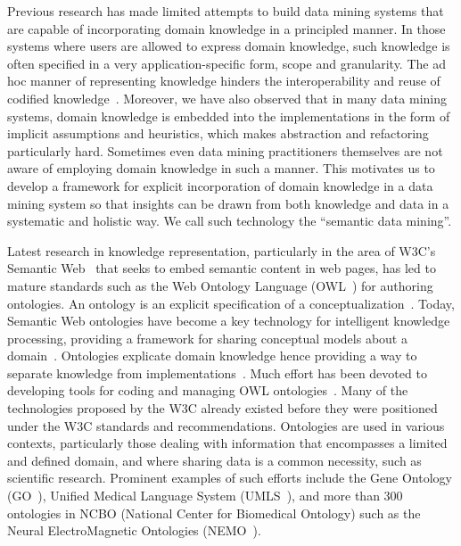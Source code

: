 Previous research has made limited attempts to build data mining systems that are capable of incorporating domain knowledge in a principled manner. In those systems where users are allowed to express domain knowledge, such knowledge is often specified in a very application-specific form, scope and granularity. The ad hoc manner of representing knowledge hinders the interoperability and reuse of codified knowledge~\cite{Pohle03}. Moreover, we have also observed that in many data mining systems, domain knowledge is embedded into the implementations in the form of implicit assumptions and heuristics, which makes abstraction and refactoring particularly hard. Sometimes even data mining practitioners themselves are not aware of employing domain knowledge in such a manner. This motivates us to develop a framework for explicit incorporation of domain knowledge in a data mining system so that insights can be drawn from both knowledge and data in a systematic and holistic way. We call such technology the ``semantic data mining''. 

Latest research in knowledge representation, particularly in the area of W3C's Semantic Web~\cite{Berners-Lee01} that seeks to embed semantic content in web pages, has led to mature standards such as the Web Ontology Language (OWL~\cite{OWL}) for authoring ontologies. An ontology is an explicit specification of a conceptualization~\cite{Gruber93}. Today, Semantic Web ontologies have become a key technology for intelligent knowledge processing, providing a framework for sharing conceptual models about a domain~\cite{Maedche03Onto}. Ontologies explicate domain knowledge hence providing a way to separate knowledge from implementations~\cite{Noy01ontologydevelopment}. Much effort has been devoted to developing tools for coding and managing OWL ontologies~\cite{Duineveld00, Knublauch04}. Many of the technologies proposed by the W3C already existed before they were positioned under the W3C standards and recommendations. Ontologies are used in various contexts, particularly those dealing with information that encompasses a limited and defined domain, and where sharing data is a common necessity, such as scientific research. Prominent examples of such efforts include the Gene Ontology (GO~\cite{GO}), Unified Medical Language System (UMLS~\cite{UMLS}), and more than 300 ontologies in NCBO (National Center for Biomedical Ontology) such as the Neural ElectroMagnetic Ontologies (NEMO~\cite{FrishkoffEtal07, FrishkoffEtal09}).

